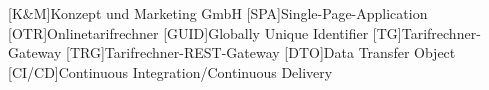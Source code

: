 \begin{acronym}
	
	[K\&M]{Konzept und Marketing GmbH}
	[SPA]{Single-Page-Application}
	[OTR]{Onlinetarifrechner}
	[GUID]{Globally Unique Identifier}
	[TG]{Tarifrechner-Gateway}
	[TRG]{Tarifrechner-REST-Gateway}
	[DTO]{Data Transfer Object}
	[CI/CD]{Continuous Integration/Continuous Delivery}
\end{acronym}